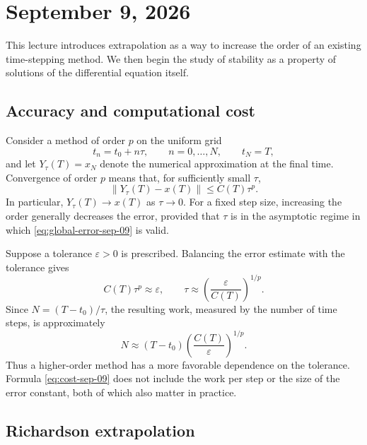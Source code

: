 \section{September 9, 2026}

This lecture introduces extrapolation as a way to increase the order of
an existing time-stepping method. We then begin the study of stability
as a property of solutions of the differential equation itself.

\subsection{Accuracy and computational cost}

Consider a method of order \(p\) on the uniform grid
\[
  t_n=t_0+n\tau,
  \qquad n=0,\ldots,N,
  \qquad t_N=T,
\]
and let \(Y_\tau(T)=x_N\) denote the numerical approximation at the
final time. Convergence of order \(p\) means that, for sufficiently
small \(\tau\),
\begin{equation}\label{eq:global-error-sep-09}
  \bigl\lVert Y_\tau(T)-x(T)\bigr\rVert
  \leq C(T)\tau^p.
\end{equation}
In particular, \(Y_\tau(T)\to x(T)\) as \(\tau\to0\). For a fixed step
size, increasing the order generally decreases the error, provided that
\(\tau\) is in the asymptotic regime in which
\eqref{eq:global-error-sep-09} is valid.

Suppose a tolerance \(\varepsilon>0\) is prescribed. Balancing the
error estimate with the tolerance gives
\[
  C(T)\tau^p\approx\varepsilon,
  \qquad
  \tau\approx
  \left(\frac{\varepsilon}{C(T)}\right)^{1/p}.
\]
Since \(N=(T-t_0)/\tau\), the resulting work, measured by the number of
time steps, is approximately
\begin{equation}\label{eq:cost-sep-09}
  N\approx (T-t_0)
  \left(\frac{C(T)}{\varepsilon}\right)^{1/p}.
\end{equation}
Thus a higher-order method has a more favorable dependence on the
tolerance. Formula \eqref{eq:cost-sep-09} does not include the work per
step or the size of the error constant, both of which also matter in
practice.

\subsection{Richardson extrapolation}

